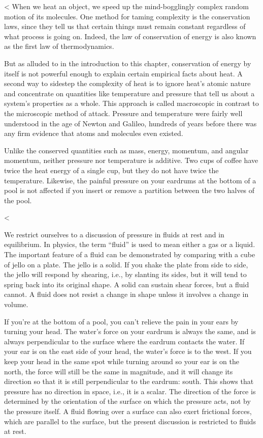 <%
When we heat an object, we speed up the mind-bogglingly
complex random motion of its molecules. One method for
taming complexity is the conservation laws, since they tell
us that certain things must remain constant regardless of
what process is going on. Indeed, the law of conservation of
energy is also known as the first law of thermodynamics.

But as alluded to in the introduction to this chapter,
conservation of energy by itself is not powerful enough to
explain certain empirical facts about heat. A second way to
sidestep the complexity of heat is to ignore heat's
atomic nature and concentrate on quantities like
temperature and pressure that tell us about a system's
properties as a whole. This approach is called
macroscopic in contrast to the microscopic method of attack.
Pressure and temperature were fairly well understood in the
age of Newton and Galileo, hundreds of years before there
was any firm evidence that atoms and molecules even existed.

Unlike the conserved quantities such as mass, energy, momentum,
and angular momentum, neither pressure nor temperature is
additive. Two cups of coffee have twice the heat
energy of a single cup, but they do not have twice the
temperature. Likewise, the painful pressure on your eardrums
at the bottom of a pool is not affected if you insert or
remove a partition between the two halves of the pool.

<%

We restrict ourselves to a discussion of pressure in fluids
at rest and in equilibrium. In physics, the term ``fluid''
is used to mean either a gas or a liquid. The important
feature of a fluid can be demonstrated by comparing with a
cube of jello on a plate. The jello is a solid. If you shake
the plate from side to side, the jello will respond by
shearing, i.e., by slanting its sides, but it will tend to
spring back into its original shape. A solid can sustain
shear forces, but a fluid cannot. A fluid does not resist a
change in shape unless it involves a change in volume.

If you're at the bottom of a pool, you can't relieve the
pain in your ears by turning your head. The water's
force on your eardrum is always the same, and is always
perpendicular to the surface where the eardrum contacts the water. If your
ear is on the east side of your head, the water's force is
to the west. If you keep your head in the same spot while turning
around so your ear is on the north, the force will still be the same in
magnitude, and it will change its direction so that it is
still perpendicular to the eardrum: south. This shows that
pressure has no direction in space, i.e., it is a scalar. The direction
of the force is determined by the orientation of the surface on which
the pressure acts, not by the pressure itself. A fluid flowing over a surface can also
exert frictional forces, which are parallel to the surface, but the present
discussion is restricted to fluids at rest.

